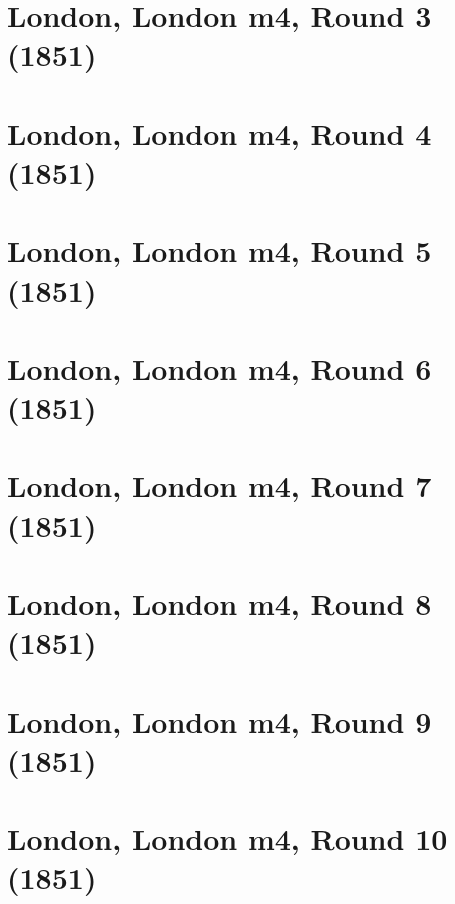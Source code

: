 \documentclass[11pt]{article}
\newcommand*\cleartoleftpage{%
   \clearpage
   \ifodd\value{page}\hbox{}\newpage\fi
}
\begin{document}
\cleartoleftpage

\section{London, London m4, Round 3 (1851)}


\cleartoleftpage

\section{London, London m4, Round 4 (1851)}


\cleartoleftpage

\section{London, London m4, Round 5 (1851)}


\cleartoleftpage

\section{London, London m4, Round 6 (1851)}


\cleartoleftpage

\section{London, London m4, Round 7 (1851)}


\cleartoleftpage

\section{London, London m4, Round 8 (1851)}


\cleartoleftpage

\section{London, London m4, Round 9 (1851)}


\cleartoleftpage

\section{London, London m4, Round 10 (1851)}

\end{document}
